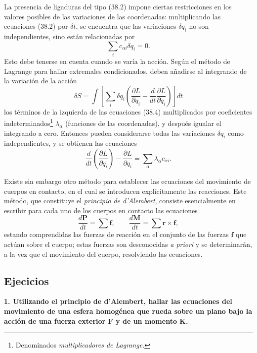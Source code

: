 \documentclass[12pt]{article}
\begin{document}
La presencia de ligaduras del tipo (38.2) impone ciertas restricciones en los valores posibles de las variaciones de las coordenadas: multiplicando las ecuaciones (38.2) por $\delta t$, se encuentra que las variaciones $\delta q_i$ no son independientes, sino están relacionadas por
\[
\sum_i c_{\alpha i} \delta q_i = 0. \tag{38.4}
\]
Esto debe tenerse en cuenta cuando se varía la acción. Según el método de Lagrange para hallar extremales condicionados, deben añadirse al integrando de la variación de la acción
\[
\delta S = \int \left[ \sum_i \delta q_i \left( \frac{\partial L}{\partial q_i} - \frac{d}{dt} \frac{\partial L}{\partial \dot{q}_i} \right) \right] dt
\]
los términos de la izquierda de las ecuaciones (38.4) multiplicados por coeficientes indeterminados\footnote{Denominados \textit{multiplicadores de Lagrange}.} $\lambda_\alpha$ (funciones de las coordenadas), y después igualar el integrando a cero. Entonces pueden considerarse todas las variaciones $\delta q_i$ como independientes, y se obtienen las ecuaciones
\[
\frac{d}{dt} \left( \frac{\partial L}{\partial \dot{q}_i} \right) - \frac{\partial L}{\partial q_i} = \sum_\alpha \lambda_\alpha c_{\alpha i}. \tag{38.5}
\]

Existe sin embargo otro método para establecer las ecuaciones del movimiento de cuerpos en contacto, en el cual se introducen explícitamente las reacciones. Este método, que constituye el \textit{principio de d'Alembert}, consiste esencialmente en escribir para cada uno de los cuerpos en contacto las ecuaciones
\[
\frac{d\mathbf{P}}{dt} = \sum \mathbf{f}, \qquad \frac{d\mathbf{M}}{dt} = \sum \mathbf{r} \times \mathbf{f}, \tag{38.6}
\]
estando comprendidas las fuerzas de reacción en el conjunto de las fuerzas $\mathbf{f}$ que actúan sobre el cuerpo; estas fuerzas son desconocidas \textit{a priori} y se determinarán, a la vez que el movimiento del cuerpo, resolviendo las ecuaciones.

\subsection{Ejecicios}
\textbf{1. Utilizando el principio de d'Alembert, hallar las ecuaciones del movimiento de una esfera homogénea que rueda sobre un plano bajo la acción de una fuerza exterior $\mathbf{F}$ y de un momento $\mathbf{K}$.}
\end{document}
